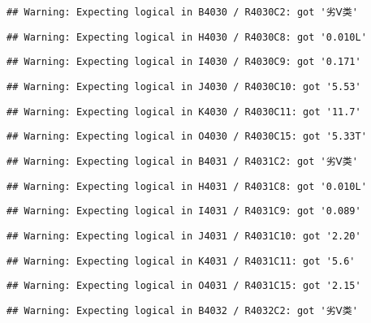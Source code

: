 \documentclass[
]{article}
\begin{document}
\begin{verbatim}
## Warning: Expecting logical in B4030 / R4030C2: got '劣Ⅴ类'
\end{verbatim}

\begin{verbatim}
## Warning: Expecting logical in H4030 / R4030C8: got '0.010L'
\end{verbatim}

\begin{verbatim}
## Warning: Expecting logical in I4030 / R4030C9: got '0.171'
\end{verbatim}

\begin{verbatim}
## Warning: Expecting logical in J4030 / R4030C10: got '5.53'
\end{verbatim}

\begin{verbatim}
## Warning: Expecting logical in K4030 / R4030C11: got '11.7'
\end{verbatim}

\begin{verbatim}
## Warning: Expecting logical in O4030 / R4030C15: got '5.33T'
\end{verbatim}

\begin{verbatim}
## Warning: Expecting logical in B4031 / R4031C2: got '劣Ⅴ类'
\end{verbatim}

\begin{verbatim}
## Warning: Expecting logical in H4031 / R4031C8: got '0.010L'
\end{verbatim}

\begin{verbatim}
## Warning: Expecting logical in I4031 / R4031C9: got '0.089'
\end{verbatim}

\begin{verbatim}
## Warning: Expecting logical in J4031 / R4031C10: got '2.20'
\end{verbatim}

\begin{verbatim}
## Warning: Expecting logical in K4031 / R4031C11: got '5.6'
\end{verbatim}

\begin{verbatim}
## Warning: Expecting logical in O4031 / R4031C15: got '2.15'
\end{verbatim}

\begin{verbatim}
## Warning: Expecting logical in B4032 / R4032C2: got '劣Ⅴ类'
\end{verbatim}
\end{document}
